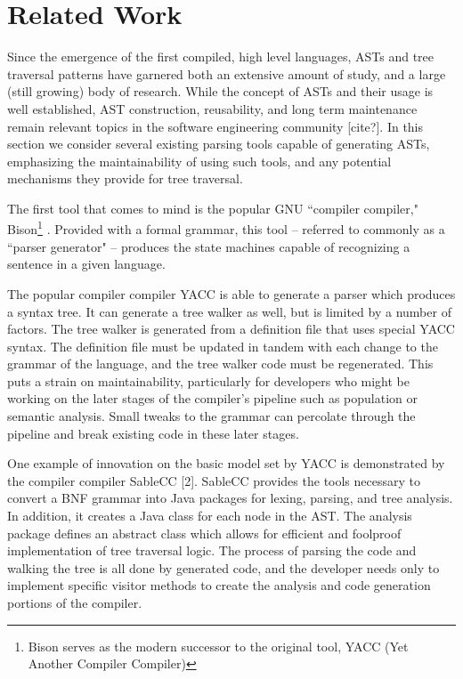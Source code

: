 \documentclass[times]{speauth}
\begin{document}
\vspace{-6pt}


\section{Related Work}
\vspace{-2pt}

Since the emergence of the first compiled, high level languages, ASTs and tree traversal patterns have garnered both an extensive amount of study, and a large (still growing) body of research. While the concept of ASTs and their usage is well established, AST construction, reusability, and long term maintenance remain relevant topics in the software engineering community [cite?]. In this section we consider several existing parsing tools capable of generating ASTs, emphasizing the maintainability of using such tools, and any potential mechanisms they provide for tree traversal.

The first tool that comes to mind is the popular GNU ``compiler compiler," Bison\footnote{Bison serves as the modern successor to the original tool, YACC (Yet Another Compiler Compiler)} \cite{levine:1992}. Provided with a formal grammar, this tool -- referred to commonly as a ``parser generator" -- produces the state machines capable of recognizing a sentence in a given language.

The popular compiler compiler YACC is able to generate a parser which produces a syntax tree. It can generate a tree walker as well, but is limited by a number of factors. The tree walker is generated from a definition file that uses special YACC syntax. The definition file must be updated in tandem with each change to the grammar of the language, and the tree walker code must be regenerated. This puts a strain on maintainability, particularly for developers who might be working on the later stages of the compiler's pipeline such as population or semantic analysis. Small tweaks to the grammar can percolate through the pipeline and break existing code in these later stages.

One example of innovation on the basic model set by YACC is demonstrated by the compiler compiler SableCC [2]. SableCC provides the tools necessary to convert a BNF grammar into Java packages for lexing, parsing, and tree analysis. In addition, it creates a Java class for each node in the AST. The analysis package defines an abstract class which allows for efficient and foolproof implementation of tree traversal logic. The process of parsing the code and walking the tree is all done by generated code, and the developer needs only to implement specific visitor methods to create the analysis and code generation portions of the compiler.
\end{document}
